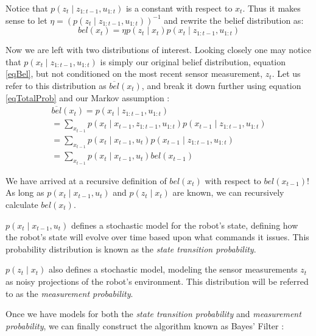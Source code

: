 Notice that \(p(z_t \mathbin{\vert} z_{1:t-1}, u_{1:t})\) is a constant with respect to \(x_t\). Thus it makes sense to let \(\eta = (p(z_t \mathbin{\vert} z_{1:t-1}, u_{1:t}))^{-1}\) and rewrite the belief distribution as:
\begin{equation*}
bel(x_t) = \eta p(z_t \mathbin{\vert} x_t) p(x_t \mathbin{\vert} z_{1:t-1}, u_{1:t})
\end{equation*}

Now we are left with two distributions of interest. Looking closely one may notice that \(p(x_t \mathbin{\vert} z_{1:t-1}, u_{1:t})\) is simply our original belief distribution, equation \ref{eqBel}, but not conditioned on the most recent sensor measurement, \(z_t\). Let us refer to this distribution as \(\overline{bel}(x_t)\), and break it down further using equation \ref{eqTotalProb} and our Markov assumption \cite{probabilisticRobotics}:
\begin{multline*}
\overline{bel}(x_t) = p(x_t \mathbin{\vert} z_{1:t-1}, u_{1:t}) \\
= \sum\limits_{x_{t-1}} p(x_t \mathbin{\vert} x_{t-1}, z_{1:t-1}, u_{1:t}) p(x_{t-1} \mathbin{\vert} z_{1:t-1}, u_{1:t}) \\
= \sum\limits_{x_{t-1}} p(x_t \mathbin{\vert} x_{t-1}, u_t) p(x_{t-1} \mathbin{\vert} z_{1:t-1}, u_{1:t}) \\
= \sum\limits_{x_{t-1}} p(x_t \mathbin{\vert} x_{t-1}, u_t) bel(x_{t-1})
\end{multline*}

We have arrived at a recursive definition of \(bel(x_t)\) with respect to \(bel(x_{t-1})\)! As long as \(p(x_t \mathbin{\vert} x_{t-1}, u_t)\) and \(p(z_t \mathbin{\vert} x_t)\) are known, we can recursively calculate \(bel(x_t)\).

\(p(x_t \mathbin{\vert} x_{t-1}, u_t)\) defines a stochastic model for the robot's state, defining how the robot's state will evolve over time based upon what commands it issues. This probability distribution is known as the \textit{state transition probability}. \cite{probabilisticRobotics}

\(p(z_t \mathbin{\vert} x_t)\) also defines a stochastic model, modeling the sensor measurements \(z_t\) as noisy projections of the robot's environment. This distribution will be referred to as the \textit{measurement probability}. \cite{probabilisticRobotics}

Once we have models for both the \textit{state transition probability} and \textit{measurement probability}, we can finally construct the algorithm known as Bayes' Filter \cite{probabilisticRobotics}:

